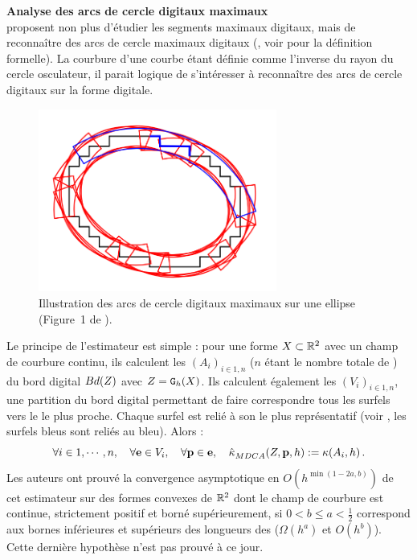 \textbf{Analyse des arcs de cercle digitaux maximaux}\\
 proposent non plus d'étudier les segments
maximaux digitaux, mais de reconnaître des arcs de cercle maximaux digitaux
(\MDCA, voir  pour la définition
formelle). La courbure d'une courbe étant définie comme l'inverse du rayon du
cercle osculateur, il parait logique de s'intéresser à reconnaître des arcs de
cercle digitaux sur la forme digitale.

\begin{figure}[ht]{
    \begin{center}
    \includegraphics[height=6cm]{images/Notions/MDCA}
    \end{center}}
    \caption[Illustration des arcs de cercle digitaux maximaux sur une ellipse.]
    {Illustration des arcs de cercle digitaux maximaux sur une ellipse (Figure~1
    de \cite{Roussillon2011}).\label{fig:mdca-curv-figure}}
\end{figure}

Le principe de l'estimateur est simple : pour une forme $X \subset \mathbb{R}^2$
avec un champ de courbure continu, ils calculent les $(A_i)_{i \in 1,n}$ \MDCA
($n$ étant le nombre totale de \MDCA) du bord digital $Bd({Z})$ avec
$Z = \mathtt{G}_{h}(X)$. Ils calculent également les $(V_i)_{i \in 1,n}$, une
partition du bord digital permettant de faire correspondre tous les surfels vers
le \MDCA le plus proche. Chaque surfel est relié à son \MDCA le plus
représentatif (voir , les surfels bleus sont
reliés au \MDCA bleu). Alors :
%
\begin{equation}
    \forall i \in 1,\cdots,n, \quad \forall \mathbf{e} \in V_i, \quad \forall \mathbf{p} \in \mathbf{e},
    \quad \hat{\kappa}^{}_{MDCA}(Z,\mathbf{p},h) := \kappa(A_i,h) \,.
\end{equation}
%
Les auteurs ont prouvé la convergence asymptotique en $O(h^{\min(1-2a,b)})$ de
cet estimateur sur des formes convexes de $\mathbb{R}^2$ dont le champ de courbure est
continue, strictement positif et borné supérieurement, si $0 < b \le a <
\frac{1}{2}$ correspond aux bornes inférieures et supérieurs des longueurs des
\MDCA (\respp $\Omega(h^a)$ et $O(h^b)$). Cette dernière hypothèse n'est pas
prouvé à ce jour.


